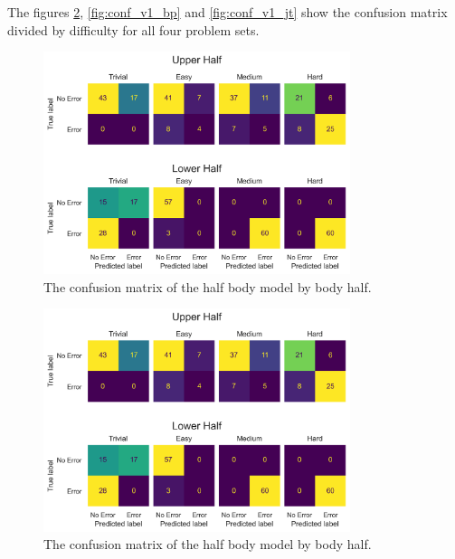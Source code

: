 

The figures \ref{fig:conf_v1_hb}, \ref{fig:conf_v1_bp} and \ref{fig:conf_v1_jt} show the confusion matrix divided by difficulty for all four problem sets.

\begin{figure}[htbp]
  \centering
  \includegraphics[width=0.8\textwidth]{figures/Results/v1/confusion/body_halves_difficulty.png}
  \caption[Full Body Confusion Matrix by Body Half and Difficulty]{The confusion matrix of the half body model by body half.}
  \label{fig:conf_v1_fb}
\end{figure}

\begin{figure}[htbp]
  \centering
  \includegraphics[width=0.8\textwidth]{figures/Results/v1/confusion/body_halves_difficulty.png}
  \caption[Half Body Confusion Matrix by Body Half and Difficulty]{The confusion matrix of the half body model by body half.}
  \label{fig:conf_v1_hb}
\end{figure}


